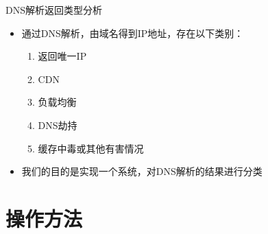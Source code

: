 \documentclass{beamer}
\begin{document}
\begin{frame}{DNS解析返回类型分析}

  \begin{itemize}
    \item 通过DNS解析，由域名得到IP地址，存在以下类别：
  \begin{enumerate}
    \item 返回唯一IP
    \item CDN
    \item 负载均衡
    \item DNS劫持
    \item 缓存中毒或其他有害情况
  \end{enumerate}
  \item 我们的目的是实现一个系统，对DNS解析的结果进行分类
  \end{itemize}
  
\end{frame}

\section{操作方法}
\end{document}
